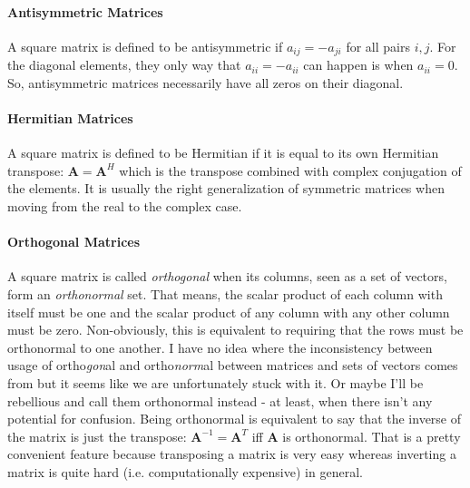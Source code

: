 \paragraph{Antisymmetric Matrices}
A square matrix is defined to be antisymmetric if $a_{ij} = -a_{ji}$ for all pairs $i,j$. For the diagonal elements, they only way that $a_{ii} = -a_{ii}$ can happen is when $a_{ii} = 0$. So, antisymmetric matrices necessarily have all zeros on their diagonal.


\paragraph{Hermitian Matrices}
A square matrix is defined to be Hermitian if it is equal to its own Hermitian transpose: $\mathbf{A} = \mathbf{A}^H$ which is the transpose combined with complex conjugation of the elements. It is usually the right generalization of symmetric matrices when moving from the real to the complex case.

\paragraph{Orthogonal Matrices} A square matrix is called \emph{orthogonal} when its columns, seen as a set of vectors, form an \emph{orthonormal} set. That means, the scalar product of each column with itself must be one and the scalar product of any column with any other column must be zero. Non-obviously, this is equivalent to requiring that the rows must be orthonormal to one another. I have no idea where the inconsistency between usage of ortho\emph{gon}al and ortho\emph{norm}al between matrices and sets of vectors comes from but it seems like we are unfortunately stuck with it. Or maybe I'll be rebellious and call them orthonormal instead - at least, when there isn't any potential for confusion. Being orthonormal is equivalent to say that the inverse of the matrix is just the transpose: $\mathbf{A}^{-1} = \mathbf{A}^T$ iff $\mathbf{A}$ is orthonormal. That is a pretty convenient feature because transposing a matrix is very easy whereas inverting a matrix is quite hard (i.e. computationally expensive) in general.



